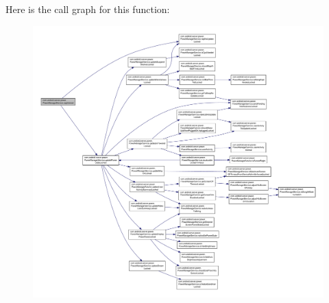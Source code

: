 Here is the call graph for this function\-:
\nopagebreak
\begin{figure}[H]
\begin{center}
\leavevmode
\includegraphics[width=350pt]{classcom_1_1android_1_1server_1_1power_1_1PowerManagerService_a0825ee46a31aad6ec4512e2f9049f32e_cgraph}
\end{center}
\end{figure}


